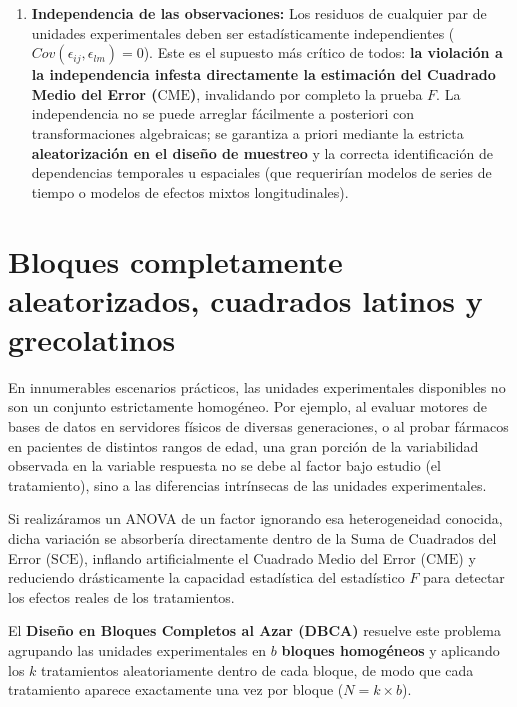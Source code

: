 \begin{enumerate}
	Si se detectan violaciones severas a la normalidad (especialmente asimetría extrema u observaciones atípicas extremas con muestras pequeñas), el científico de datos debe utilizar la alternativa no paramétrica del ANOVA: la \textbf{Prueba de Kruskal-Wallis} (basada en rangos y medianas en lugar de medias y varianzas).

	\item \textbf{Independencia de las observaciones:} Los residuos de cualquier par de unidades experimentales deben ser estadísticamente independientes ($Cov(\epsilon_{ij}, \epsilon_{lm}) = 0$). Este es el supuesto más crítico de todos: \textbf{la violación a la independencia infesta directamente la estimación del Cuadrado Medio del Error ($\text{CME}$)}, invalidando por completo la prueba $F$. La independencia no se puede arreglar fácilmente a posteriori con transformaciones algebraicas; se garantiza a priori mediante la estricta \textbf{aleatorización en el diseño de muestreo} y la correcta identificación de dependencias temporales u espaciales (que requerirían modelos de series de tiempo o modelos de efectos mixtos longitudinales).
\end{enumerate}

\section{Bloques completamente aleatorizados, cuadrados latinos y grecolatinos}

En innumerables escenarios prácticos, las unidades experimentales disponibles no son un conjunto estrictamente homogéneo. Por ejemplo, al evaluar motores de bases de datos en servidores físicos de diversas generaciones, o al probar fármacos en pacientes de distintos rangos de edad, una gran porción de la variabilidad observada en la variable respuesta no se debe al factor bajo estudio (el tratamiento), sino a las diferencias intrínsecas de las unidades experimentales.

Si realizáramos un ANOVA de un factor ignorando esa heterogeneidad conocida, dicha variación se absorbería directamente dentro de la Suma de Cuadrados del Error ($\text{SCE}$), inflando artificialmente el Cuadrado Medio del Error ($\text{CME}$) y reduciendo drásticamente la capacidad estadística del estadístico $F$ para detectar los efectos reales de los tratamientos.

El \textbf{Diseño en Bloques Completos al Azar (DBCA)} resuelve este problema agrupando las unidades experimentales en $b$ \textbf{bloques homogéneos} y aplicando los $k$ tratamientos aleatoriamente dentro de cada bloque, de modo que cada tratamiento aparece exactamente una vez por bloque ($N = k \times b$).

